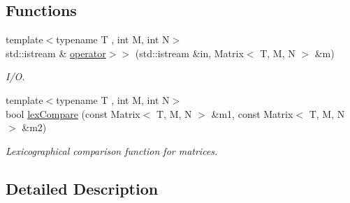 \subsection*{Functions}
\begin{DoxyCompactItemize}
\item 
\hypertarget{group___eigen_typedefs_ga393e43d3acb273916941d5f75e5a9c3d}{{\footnotesize template$<$typename T , int M, int N$>$ }\\std\-::istream \& \hyperlink{group___eigen_typedefs_ga393e43d3acb273916941d5f75e5a9c3d}{operator$>$$>$} (std\-::istream \&in, Matrix$<$ T, M, N $>$ \&m)}\label{group___eigen_typedefs_ga393e43d3acb273916941d5f75e5a9c3d}

\begin{DoxyCompactList}\small\item\em I/\-O. \end{DoxyCompactList}\item 
\hypertarget{group___eigen_typedefs_ga9b2a3c755e12d93b990fb4bbefaec6b6}{{\footnotesize template$<$typename T , int M, int N$>$ }\\bool \hyperlink{group___eigen_typedefs_ga9b2a3c755e12d93b990fb4bbefaec6b6}{lex\-Compare} (const Matrix$<$ T, M, N $>$ \&m1, const Matrix$<$ T, M, N $>$ \&m2)}\label{group___eigen_typedefs_ga9b2a3c755e12d93b990fb4bbefaec6b6}

\begin{DoxyCompactList}\small\item\em Lexicographical comparison function for matrices. \end{DoxyCompactList}\end{DoxyCompactItemize}


\subsection{Detailed Description}
